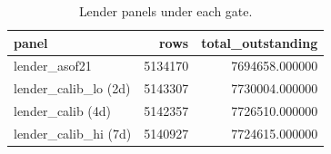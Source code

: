 \begin{table}
\caption{Lender panels under each gate.}
\label{tab:nb16_calib_panel_sizes}
\begin{tabular}{lrr}
\toprule
panel & rows & total_outstanding \\
\midrule
lender_asof21 & 5134170 & 7694658.000000 \\
lender_calib_lo (2d) & 5143307 & 7730004.000000 \\
lender_calib (4d) & 5142357 & 7726510.000000 \\
lender_calib_hi (7d) & 5140927 & 7724615.000000 \\
\bottomrule
\end{tabular}
\end{table}
